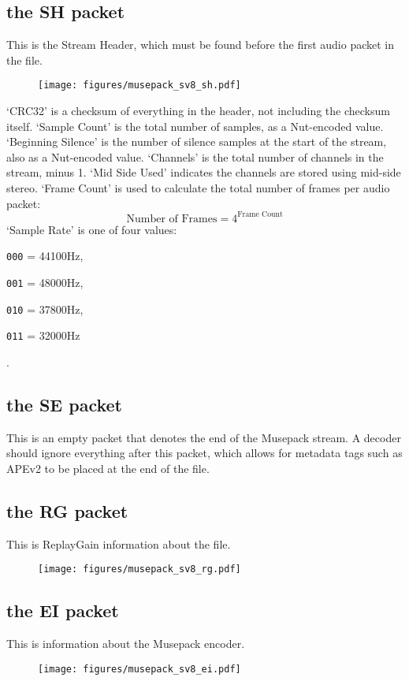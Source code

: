 \subsection{the SH packet}
This is the Stream Header, which must be found before the first
audio packet in the file.
\begin{figure}[h]
\texttt{[image: figures/musepack\_sv8\_sh.pdf]}
\end{figure}
\par
\noindent
`CRC32' is a checksum of everything in the header, not including the
checksum itself.
`Sample Count' is the total number of samples, as a Nut-encoded value.
`Beginning Silence' is the number of silence samples at the start
of the stream, also as a Nut-encoded value.
`Channels' is the total number of channels in the stream, minus 1.
`Mid Side Used' indicates the channels are stored using mid-side stereo.
`Frame Count' is used to calculate the total number of frames per
audio packet:
\begin{equation}
\text{Number of Frames} = 4 ^ \text{Frame Count}
\end{equation}
`Sample Rate' is one of four values:

\begin{inparaenum}
\item[\texttt{000} = ] 44100Hz,
\item[\texttt{001} = ] 48000Hz,
\item[\texttt{010} = ] 37800Hz,
\item[\texttt{011} = ] 32000Hz
\end{inparaenum}
.

\subsection{the SE packet}
This is an empty packet that denotes the end of the Musepack stream.
A decoder should ignore everything after this packet, which allows
for metadata tags such as APEv2 to be placed at the end of the file.

\subsection{the RG packet}
This is ReplayGain information about the file.
\begin{figure}[h]
\texttt{[image: figures/musepack\_sv8\_rg.pdf]}
\end{figure}

\subsection{the EI packet}
This is information about the Musepack encoder.
\begin{figure}[h]
\texttt{[image: figures/musepack\_sv8\_ei.pdf]}
\end{figure}
